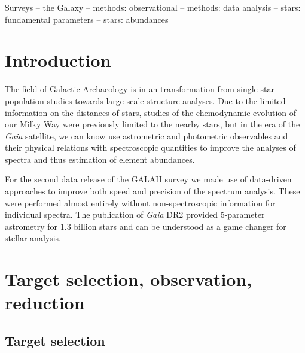 \documentclass[fleqn,usenatbib,useAMS]{mnras}
\newcommand{\Gaia}{\textit{Gaia}\xspace}
\begin{document}
\begin{keywords}
Surveys -- 
the Galaxy --
methods: observational --
methods: data analysis --
stars: fundamental parameters -- 
stars: abundances
\end{keywords}



\section{Introduction} \label{sec:introduction}

The field of Galactic Archaeology is in an transformation from single-star population studies towards large-scale structure analyses. Due to the limited information on the distances of stars, studies of the chemodynamic evolution of our Milky Way were previously limited to the nearby stars, but in the era of the \Gaia satellite, we can know use astrometric and photometric observables and their physical relations with spectroscopic quantities to improve the analyses of spectra and thus estimation of element abundances.

For the second data release of the GALAH survey \citep{Buder2018} we made use of data-driven approaches to improve both speed and precision of the spectrum analysis. These were performed almost entirely without non-spectroscopic information for individual spectra. The publication of \Gaia DR2 \citep{Brown2018, Lindegren2018} provided 5-parameter astrometry for 1.3 billion stars and can be understood as a game changer for stellar analysis.


\section{Target selection, observation, reduction} \label{sec:selection_observation_reduction}

\subsection{Target selection}
\end{document}
